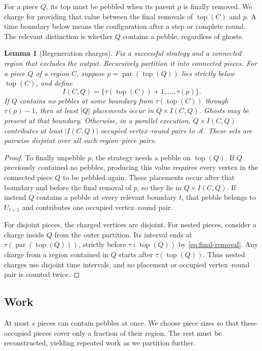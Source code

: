 \documentclass[11pt]{article}
\newtheorem{lemma}[lemma]{Lemma}
\theoremstyle{definition}
\theoremstyle{remark}
\DeclareMathOperator{\parv}{par}
\DeclareMathOperator{\topv}{top}
\newcommand{\Area}{\mathcal A}
\begin{document}
For a piece $Q$, its top must be pebbled when its parent $p$ is finally removed. We charge for providing that value between the final removals of $\topv(C)$ and $p$. A time boundary below means the configuration after a step or complete round. The relevant distinction is whether $Q$ contains a pebble, regardless of ghosts.

\begin{lemma}[Regeneration charges]
\label{lem:charging}
Fix a successful strategy and a connected region that excludes the output. Recursively partition it into connected pieces. For a piece $Q$ of a region $C$, suppose $p=\parv(\topv(Q))$ lies strictly below $\topv(C)$, and define
\begin{equation}
 I(C,Q)=\{\tau(\topv(C))+1,\ldots,\tau(p)\}.
 \label{eq:charge-interval}
\end{equation}
If $Q$ contains no pebbles at some boundary from $\tau(\topv(C))$ through $\tau(p)-1$, then at least $|Q|$ placements occur in $Q\times I(C,Q)$. Ghosts may be present at that boundary. Otherwise, in a parallel execution, $Q\times I(C,Q)$ contributes at least $|I(C,Q)|$ occupied vertex--round pairs to $\Area$. These sets are pairwise disjoint over all such region--piece pairs.
\end{lemma}
\begin{proof}
To finally unpebble $p$, the strategy needs a pebble on $\topv(Q)$. If $Q$ previously contained no pebbles, producing this value requires every vertex in the connected piece $Q$ to be pebbled again. These placements occur after that boundary and before the final removal of $p$, so they lie in $Q\times I(C,Q)$. If instead $Q$ contains a pebble at every relevant boundary $t$, that pebble belongs to $U_{t+1}$ and contributes one occupied vertex--round pair.

For disjoint pieces, the charged vertices are disjoint. For nested pieces, consider a charge inside $Q$ from the outer partition. Its interval ends at $\tau(\parv(\topv(Q)))$, strictly before $\tau(\topv(Q))$ by \cref{eq:final-removal}. Any charge from a region contained in $Q$ starts after $\tau(\topv(Q))$. Thus nested charges use disjoint time intervals, and no placement or occupied vertex--round pair is counted twice.
\end{proof}

\subsection{Work}

At most $s$ pieces can contain pebbles at once. We choose piece sizes so that these occupied pieces cover only a fraction of their region. The rest must be reconstructed, yielding repeated work as we partition further.
\end{document}

